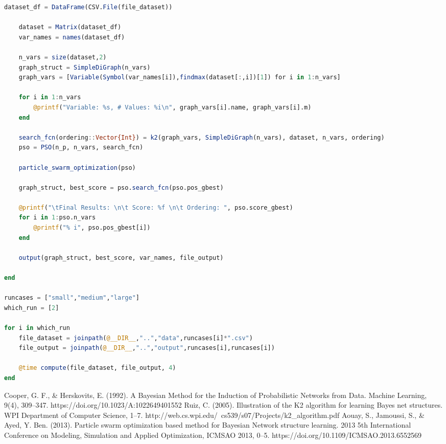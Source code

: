 \documentclass[twoside,11pt]{article}
\begin{document}
\begin{algorithm}
\begin{lstlisting}[language=Julia]
    dataset_df = DataFrame(CSV.File(file_dataset))

    dataset = Matrix(dataset_df)
    var_names = names(dataset_df)

    n_vars = size(dataset,2)
    graph_struct = SimpleDiGraph(n_vars)
    graph_vars = [Variable(Symbol(var_names[i]),findmax(dataset[:,i])[1]) for i in 1:n_vars]

    for i in 1:n_vars
        @printf("Variable: %s, # Values: %i\n", graph_vars[i].name, graph_vars[i].m)
    end

    search_fcn(ordering::Vector{Int}) = k2(graph_vars, SimpleDiGraph(n_vars), dataset, n_vars, ordering)
    pso = PSO(n_p, n_vars, search_fcn)

    particle_swarm_optimization(pso)

    graph_struct, best_score = pso.search_fcn(pso.pos_gbest)

    @printf("\tFinal Results: \n\t Score: %f \n\t Ordering: ", pso.score_gbest)
    for i in 1:pso.n_vars
        @printf("% i", pso.pos_gbest[i])
    end

    output(graph_struct, best_score, var_names, file_output)

end

runcases = ["small","medium","large"]
which_run = [2]

for i in which_run
    file_dataset = joinpath(@__DIR__,"..","data",runcases[i]*".csv")
    file_output = joinpath(@__DIR__,"..","output",runcases[i],runcases[i])

    @time compute(file_dataset, file_output, 4)
end
\end{lstlisting}
\end{algorithm}
\begin{thebibliography}{3}
Cooper, G. F., \& Herskovits, E. (1992). A Bayesian Method for the Induction of Probabilistic Networks from Data. Machine Learning, 9(4), 309–347. https://doi.org/10.1023/A:1022649401552
Ruiz, C. (2005). Illustration of the K2 algorithm for learning Bayes net structures. WPI Department of Computer Science, 1–7. http://web.cs.wpi.edu/~cs539/s07/Projects/k2\_algorithm.pdf
Aouay, S., Jamoussi, S., \& Ayed, Y. Ben. (2013). Particle swarm optimization based method for Bayesian Network structure learning. 2013 5th International Conference on Modeling, Simulation and Applied Optimization, ICMSAO 2013, 0–5. https://doi.org/10.1109/ICMSAO.2013.6552569
\end{thebibliography}
\end{document}
